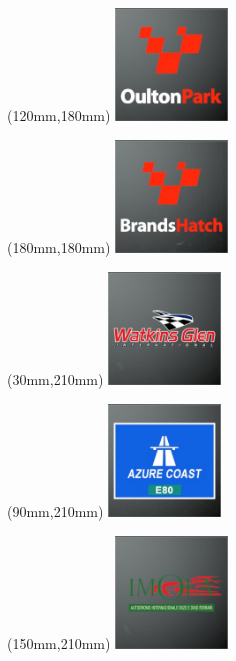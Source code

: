 \begin{textblock*}{30mm}(120mm,180mm)%
\includegraphics[width=30mm]{LG/2015-05-20_00091.png}
\end{textblock*}
\begin{textblock*}{30mm}(180mm,180mm)%
\includegraphics[width=30mm]{LG/2015-05-20_00074.png}
\end{textblock*}
\begin{textblock*}{30mm}(30mm,210mm)%
\includegraphics[width=30mm]{LG/2015-05-20_00097.png}
\end{textblock*}
\begin{textblock*}{30mm}(90mm,210mm)%
\includegraphics[width=30mm]{LG/2015-05-20_00073.png}
\end{textblock*}
\begin{textblock*}{30mm}(150mm,210mm)%
\includegraphics[width=30mm]{LG/2015-05-20_00083.png}
\end{textblock*}

